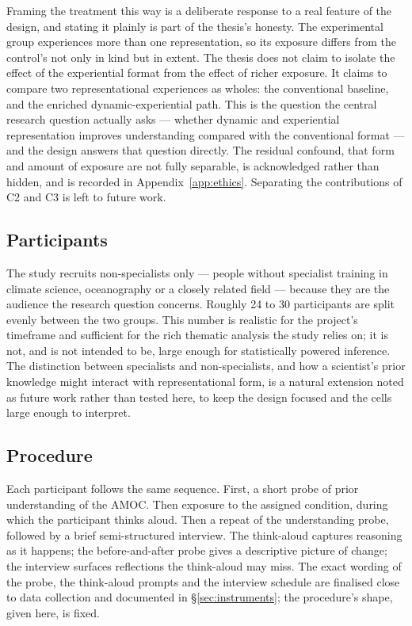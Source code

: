 Framing the treatment this way is a deliberate response to a real feature of the design, and stating it plainly is part of the thesis's honesty. The experimental group experiences more than one representation, so its exposure differs from the control's not only in kind but in extent. The thesis does not claim to isolate the effect of the experiential format from the effect of richer exposure. It claims to compare two representational experiences as wholes: the conventional baseline, and the enriched dynamic-experiential path. This is the question the central research question actually asks --- whether dynamic and experiential representation improves understanding compared with the conventional format --- and the design answers that question directly. The residual confound, that form and amount of exposure are not fully separable, is acknowledged rather than hidden, and is recorded in Appendix~\ref{app:ethics}. Separating the contributions of C2 and C3 is left to future work.
 
\subsection{Participants}
\label{subsec:evaluate-participants}
 
The study recruits non-specialists only --- people without specialist training in climate science, oceanography or a closely related field --- because they are the audience the research question concerns. Roughly 24 to 30 participants are split evenly between the two groups. This number is realistic for the project's timeframe and sufficient for the rich thematic analysis the study relies on; it is not, and is not intended to be, large enough for statistically powered inference. The distinction between specialists and non-specialists, and how a scientist's prior knowledge might interact with representational form, is a natural extension noted as future work rather than tested here, to keep the design focused and the cells large enough to interpret.
 
\subsection{Procedure}
\label{subsec:evaluate-procedure}
 
Each participant follows the same sequence. First, a short probe of prior understanding of the AMOC. Then exposure to the assigned condition, during which the participant thinks aloud. Then a repeat of the understanding probe, followed by a brief semi-structured interview. The think-aloud captures reasoning as it happens; the before-and-after probe gives a descriptive picture of change; the interview surfaces reflections the think-aloud may miss. The exact wording of the probe, the think-aloud prompts and the interview schedule are finalised close to data collection and documented in \S\ref{sec:instruments}; the procedure's shape, given here, is fixed.
 
